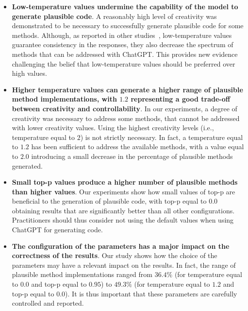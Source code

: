 \begin{itemize}
\item \textbf{Low-temperature values undermine the capability of the model to generate plausible code}. A reasonably high level of creativity was demonstrated to be necessary to successfully generate plausible code for some methods. Although, as reported in other studies~\cite{arora2024optimizing,liu2024your,ouyang2023empirical}, low-temperature values guarantee consistency in the responses, they also decrease the spectrum of methods that can be addressed with ChatGPT. This provides new evidence challenging the belief that low-temperature values should be preferred over high values.%

\item \textbf{Higher temperature values can generate a higher range of plausible method implementations, with $1.2$ representing a good trade-off between creativity and controllability}. In our experiments, a degree of creativity was necessary to address some methods, that cannot be addressed with lower creativity values. Using the highest creativity levels (i.e., temperature equal to $2$) is not strictly necessary. In fact, a temperature equal to $1.2$ has been sufficient to address the available methods, with a value equal to $2.0$ introducing a small decrease in the percentage of plausible methods generated.

\item \textbf{Small top-p values produce a higher number of plausible methods than higher values}. Our experiments show how small values of top-p are beneficial to the generation of plausible code, with top-p equal to $0.0$ obtaining results that are significantly better than all other configurations. Practitioners should thus consider not using the default values when using ChatGPT for generating code.

\item \textbf{The configuration of the parameters has a major impact on the correctness of the results}. Our study shows how the choice of the parameters may have a relevant impact on the results. In fact, the range of plausible method implementations ranged from $36.4\%$ (for temperature equal to $0.0$ and top-p equal to $0.95$) to $49.3\%$ (for temperature equal to $1.2$ and top-p equal to $0.0$). It is thus important that these parameters are carefully controlled and reported.


\end{itemize}
